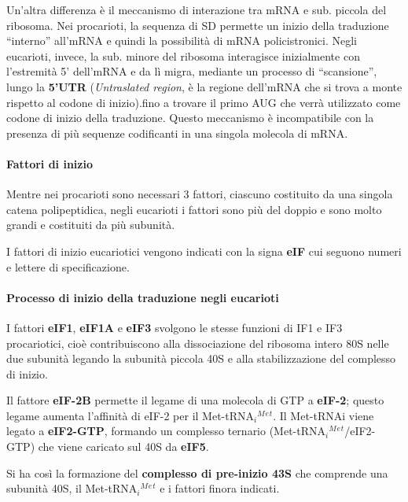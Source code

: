 \documentclass[]{article}
\begin{document}
Un'altra differenza è il meccanismo di interazione tra mRNA e sub.
piccola del ribosoma. Nei procarioti, la sequenza di SD permette un
inizio della traduzione ``interno'' all'mRNA e quindi la possibilità di
mRNA policistronici. Negli eucarioti, invece, la sub. minore del
ribosoma interagisce inizialmente con l'estremità 5' dell'mRNA e da lì
migra, mediante un processo di ``scansione'', lungo la \textbf{5'UTR}
(\emph{Untraslated region}, è la regione dell'mRNA che si trova a monte
rispetto al codone di inizio).fino a trovare il primo AUG che verrà
utilizzato come codone di inizio della traduzione. Questo meccanismo è
incompatibile con la presenza di più sequenze codificanti in una singola
molecola di mRNA.

\paragraph{Fattori di inizio}\label{fattori-di-inizio}

Mentre nei procarioti sono necessari 3 fattori, ciascuno costituito da
una singola catena polipeptidica, negli eucarioti i fattori sono più del
doppio e sono molto grandi e costituiti da più subunità.

I fattori di inizio eucariotici vengono indicati con la signa
\textbf{eIF} cui seguono numeri e lettere di specificazione.

\paragraph{Processo di inizio della traduzione negli
eucarioti}\label{processo-di-inizio-della-traduzione-negli-eucarioti}

I fattori \textbf{eIF1}, \textbf{eIF1A} e \textbf{eIF3} svolgono le
stesse funzioni di IF1 e IF3 procariotici, cioè contribuiscono alla
dissociazione del ribosoma intero 80S nelle due subunità legando la
subunità piccola 40S e alla stabilizzazione del complesso di inizio.

Il fattore \textbf{eIF-2B} permette il legame di una molecola di GTP a
\textbf{eIF-2}; questo legame aumenta l'affinità di eIF-2 per il
Met-tRNA\(_i\)\(^M\)\(^e\)\(^t\). Il Met-tRNAi viene legato a
\textbf{eIF2-GTP}, formando un complesso ternario
(Met-tRNA\(_i\)\(^M\)\(^e\)\(^t\)/eIF2-GTP) che viene caricato sul 40S
da \textbf{eIF5}.

Si ha così la formazione del \textbf{complesso di pre-inizio 43S} che
comprende una subunità 40S, il Met-tRNA\(_i\)\(^M\)\(^e\)\(^t\) e i
fattori finora indicati.
\end{document}
